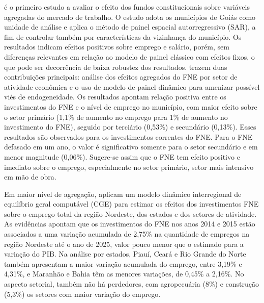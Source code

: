  é o primeiro estudo a avaliar o efeito dos fundos constitucionais sobre variáveis agregadas do mercado de trabalho. O estudo adota os municípios de Goiás como unidade de análise e aplica o método de painel espacial autorregressivo (SAR), a fim de controlar também por características da vizinhança do município. Os resultados indicam efeitos positivos sobre emprego e salário, porém, sem diferenças relevantes em relação ao modelo de painel clássico com efeitos fixos, o que pode ser decorrência de baixa robustez dos resultados.  trazem duas contribuições principais: análise dos efeitos agregados do FNE por setor de atividade econômica e o uso de modelo de painel dinâmico para amenizar possível viés de endogeneidade. Os resultados apontam relação positiva entre os investimentos do FNE e o nível de emprego no município, com maior efeito sobre o setor primário (1,1\% de aumento no emprego para 1\% de aumento no investimento do FNE), seguido por terciário (0,53\%) e secundário (0,13\%). Esses resultados são observados para os investimentos correntes do FNE. Para o FNE defasado em um ano, o valor é significativo somente para o setor secundário e em menor magnitude (0,06\%). Sugere-se assim que o FNE tem efeito positivo e imediato sobre o emprego, especialmente no setor primário, setor mais intensivo em mão de obra.

Em maior nível de agregação,  aplicam um modelo dinâmico interregional de equilíbrio geral computável (CGE) para estimar os efeitos dos investimentos FNE sobre o emprego total da região Nordeste, dos estados e dos setores de atividade. As evidências apontam que os investimentos do FNE nos anos 2014 e 2015 estão associados a uma variação acumulada de 2,75\% na quantidade de empregos na região Nordeste até o ano de 2025, valor pouco menor que o estimado para a variação do PIB. Na análise por estados, Piauí, Ceará e Rio Grande do Norte também apresentam a maior variação acumulada do emprego, entre 3,19\% e 4,31\%, e Maranhão e Bahia têm as menores variações, de 0,45\% a 2,16\%. No aspecto setorial, também não há perdedores, com agropecuária (8\%) e construção (5,3\%) os setores com maior variação do emprego.

